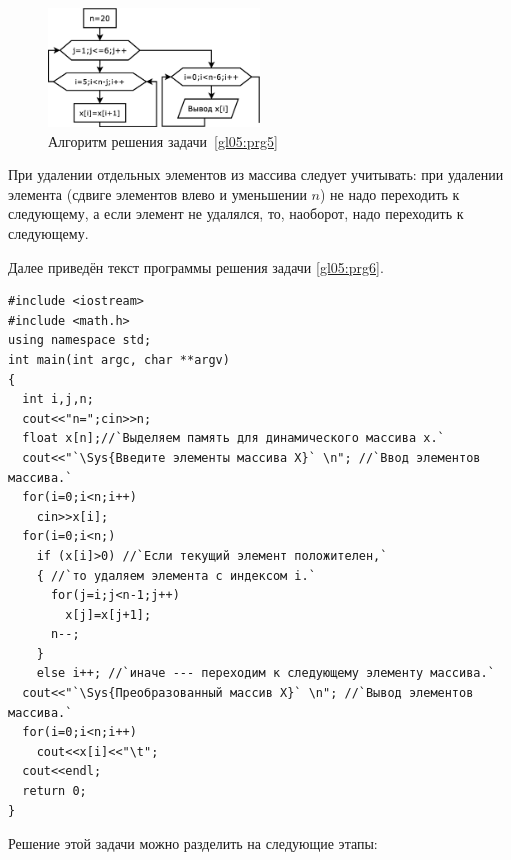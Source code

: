  
\begin{figure}[htb]
\begin{center}
\includegraphics[width=0.5\textwidth]{img/ris_5_11}
\caption{Алгоритм решения задачи~\ref{gl05:prg5}}
\label{ch05:refDrawing10}
\end{center}
\end{figure}


При удалении отдельных элементов из массива следует учитывать: при удалении элемента (сдвиге элементов влево и
уменьшении $n$) не надо переходить к следующему, а если элемент не удалялся, то, наоборот, надо переходить к следующему.

Далее приведён текст программы решения задачи \ref{gl05:prg6}.
\begin{lstlisting}
#include <iostream>
#include <math.h>
using namespace std;
int main(int argc, char **argv)
{
  int i,j,n;
  cout<<"n=";cin>>n;
  float x[n];//`Выделяем память для динамического массива x.`
  cout<<"`\Sys{Введите элементы массива X}` \n"; //`Ввод элементов массива.`
  for(i=0;i<n;i++)
    cin>>x[i];
  for(i=0;i<n;)
    if (x[i]>0) //`Если текущий элемент положителен,`
    { //`то удаляем элемента с индексом i.`
      for(j=i;j<n-1;j++)
        x[j]=x[j+1];
      n--;
    }
    else i++; //`иначе --- переходим к следующему элементу массива.`	
  cout<<"`\Sys{Преобразованный массив X}` \n"; //`Вывод элементов массива.`
  for(i=0;i<n;i++)
    cout<<x[i]<<"\t";
  cout<<endl;
  return 0;
}
\end{lstlisting}



Решение этой задачи можно разделить на следующие этапы:

